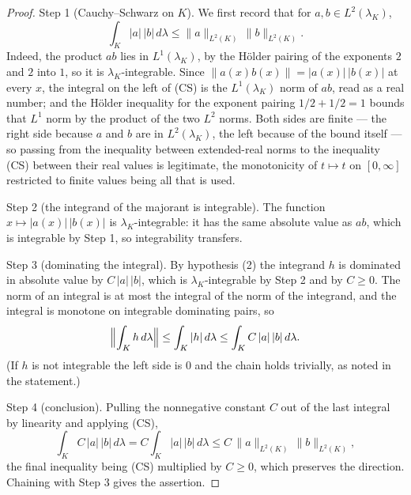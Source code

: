 \begin{proof}
Step 1 (Cauchy--Schwarz on $K$).  We first record that for $a, b \in
L^2(\lambda_K)$,
\[
  \int_K |a|\,|b| \, d\lambda
    \leq \|a\|_{L^2(K)}\,\|b\|_{L^2(K)} . \tag{CS}
\]
Indeed, the product $ab$ lies in $L^1(\lambda_K)$, by the H\"older pairing of
the exponents $2$ and $2$ into $1$, so it is $\lambda_K$-integrable.  Since
$\bigl\| a(x)b(x) \bigr\| = |a(x)|\,|b(x)|$ at every $x$, the integral on the
left of (CS) is the $L^1(\lambda_K)$ norm of $ab$, read as a real number; and
the H\"older inequality for the exponent pairing $1/2 + 1/2 = 1$ bounds that
$L^1$ norm by the product of the two $L^2$ norms.  Both sides are finite --- the
right side because $a$ and $b$ are in $L^2(\lambda_K)$, the left because of the
bound itself --- so passing from the inequality between extended-real norms to
the inequality (CS) between their real values is legitimate, the monotonicity of
$t \mapsto t$ on $[0,\infty]$ restricted to finite values being all that is
used.

Step 2 (the integrand of the majorant is integrable).  The function
$x \mapsto |a(x)|\,|b(x)|$ is $\lambda_K$-integrable: it has the same absolute
value as $ab$, which is integrable by Step 1, so integrability transfers.

Step 3 (dominating the integral).  By hypothesis (2) the integrand $h$ is
dominated in absolute value by $C\,|a|\,|b|$, which is $\lambda_K$-integrable by
Step 2 and by $C \geq 0$.  The norm of an integral is at most the integral of
the norm of the integrand, and the integral is monotone on integrable
dominating pairs, so
\[
  \Bigl\| \int_K h \, d\lambda \Bigr\|
    \leq \int_K |h| \, d\lambda
    \leq \int_K C\,|a|\,|b| \, d\lambda .
\]
(If $h$ is not integrable the left side is $0$ and the chain holds trivially, as
noted in the statement.)

Step 4 (conclusion).  Pulling the nonnegative constant $C$ out of the last
integral by linearity and applying (CS),
\[
  \int_K C\,|a|\,|b| \, d\lambda
    = C \int_K |a|\,|b| \, d\lambda
    \leq C\,\|a\|_{L^2(K)}\,\|b\|_{L^2(K)} ,
\]
the final inequality being (CS) multiplied by $C \geq 0$, which preserves the
direction.  Chaining with Step 3 gives the assertion.
\end{proof}
